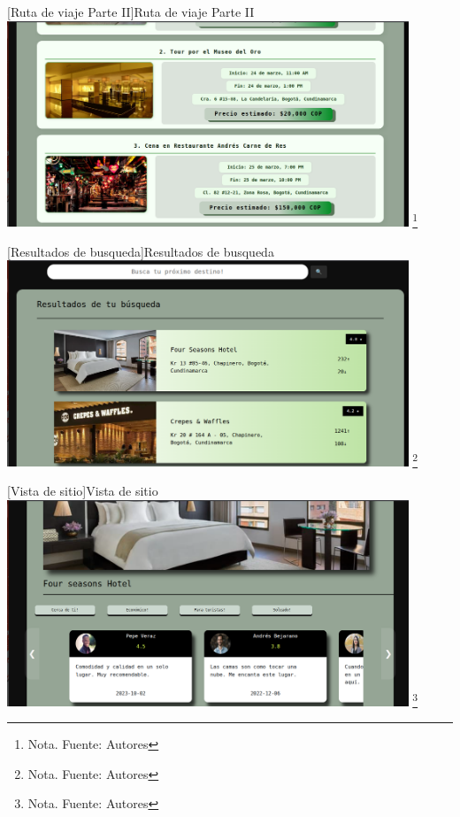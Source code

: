 \begin{itemize}
      \vspace{2mm}
    \begin{minipage}{0.9\textwidth}
    \centering
    [{Ruta de viaje Parte II}]{Ruta de viaje Parte II}
    \label{prot9}
    \includegraphics[width=0.9\textwidth]{Content/Images/RutaDeViaje2.png}
    \footnote{Nota. \textup{Fuente: Autores}}
    \end{minipage}

      \vspace{2mm}
    \begin{minipage}{0.9\textwidth}
    \centering
    [{Resultados de busqueda}]{Resultados de busqueda}
    \label{prot10}
    \includegraphics[width=0.9\textwidth]{Content/Images/ResultadosDeBusqueda.png}
    \footnote{Nota. \textup{Fuente: Autores}}
    \end{minipage}

       \vspace{2mm}
    \begin{minipage}{0.9\textwidth}
    \centering
    [{Vista de sitio}]{Vista de sitio}
    \label{prot11}
    \includegraphics[width=0.9\textwidth]{Content/Images/VistaDeSitio.png}
    \footnote{Nota. \textup{Fuente: Autores}}
    \end{minipage}


\end{itemize}
